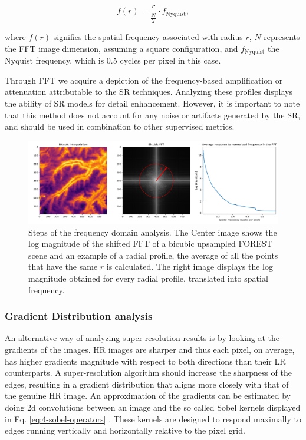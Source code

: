         \begin{equation}
            f(r) = \frac{r}{\frac{N}{2}} \cdot f_{\text{Nyquist}},
        \end{equation}

        where \( f(r) \) signifies the spatial frequency associated with radius \( r \), \( N \) represents the FFT image dimension, assuming a square configuration, and \( f_{\text{Nyquist}} \) the Nyquist frequency, which is 0.5 cycles per pixel in this case.

        Through FFT we acquire a depiction of the frequency-based amplification or attenuation attributable to the SR techniques. 
        Analyzing these profiles displays the ability of SR models for detail enhancement. 
        However, it is important to note that this method does not account for any noise or artifacts generated by the SR, and should be used in combination to other supervised metrics.

        \begin{figure}[H]
            \centering
            \includegraphics[width=\linewidth]{Includes/4-frequency-analysis.pdf}
            \caption{Steps of the frequency domain analysis. The Center image shows the log magnitude of the shifted FFT of a bicubic upsampled FOREST scene and an example of a radial profile, the average of all the points that have the same $r$ is calculated. The right image displays the log magnitude obtained for every radial profile, translated into spatial frequency.  }
            \label{fig:4-frequency-analysis}
        \end{figure}

        \subsubsection{Gradient Distribution analysis}


        An alternative way of analyzing super-resolution results is by looking at the gradients of the images. 
        HR images are sharper and thus each pixel, on average, has higher gradients magnitude with respect to both directions than their LR counterparts.
        A super-resolution algorithm should increase the sharpness of the edges, resulting in a gradient distribution that aligns more closely with that of the genuine HR image.
        An approximation of the gradients can be estimated by doing 2d convolutions between an image and the so called Sobel kernels displayed in Eq. \ref{eq:4-sobel-operators} \cite{Sobel1990AnI3}.
        These kernels are designed to respond maximally to edges running vertically and horizontally relative to the pixel grid.
        
